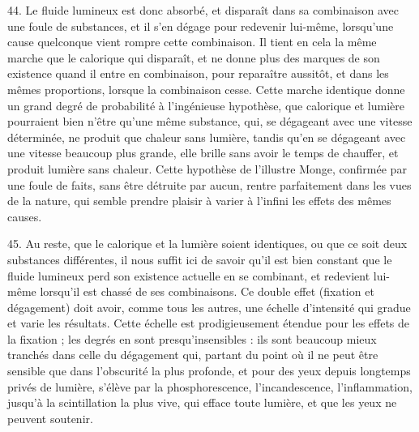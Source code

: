 \documentclass[a4paper, 11pt, oneside, polutonikogreek, french]{article}
\begin{document}
44. Le fluide lumineux est donc absorbé, et disparaît dans sa combinaison avec une foule de substances, et il s'en dégage pour redevenir lui-même, lorsqu'une cause quelconque vient rompre cette combinaison. Il tient en cela la même marche que le calorique qui disparaît, et ne donne plus des marques de son existence quand il entre en combinaison, pour reparaître aussitôt, et dans les mêmes proportions, lorsque la combinaison cesse. Cette marche identique donne un grand degré de probabilité à l'ingénieuse hypothèse, que calorique et lumière pourraient bien n'être qu'une même substance, qui, se dégageant avec une vitesse déterminée, ne produit que chaleur sans lumière, tandis qu'en se dégageant avec une vitesse beaucoup plus grande, elle brille sans avoir le temps de chauffer, et produit lumière sans chaleur. Cette hypothèse de l'illustre Monge, confirmée par une foule de faits, sans être détruite par aucun, rentre parfaitement dans les vues de la nature, qui semble prendre plaisir à varier à l'infini les effets des mêmes causes.

45. Au reste, que le calorique et la lumière soient identiques, ou que ce soit deux substances différentes, il nous suffit ici de savoir qu'il est bien constant que le fluide lumineux perd son existence actuelle en se combinant, et redevient lui-même lorsqu'il est chassé de ses combinaisons. Ce double effet (fixation et dégagement) doit avoir, comme tous les autres, une échelle d'intensité qui gradue et varie les résultats. Cette échelle est prodigieusement étendue pour les effets de la fixation ; les degrés en sont presqu'insensibles : ils sont beaucoup mieux tranchés dans celle du dégagement qui, partant du point où il ne peut être sensible que dans l'obscurité la plus profonde, et pour des yeux depuis longtemps privés de lumière, s'élève par la phosphorescence, l'incandescence, l'inflammation, jusqu'à la scintillation la plus vive, qui efface toute lumière, et que les yeux ne peuvent soutenir.
\end{document}
